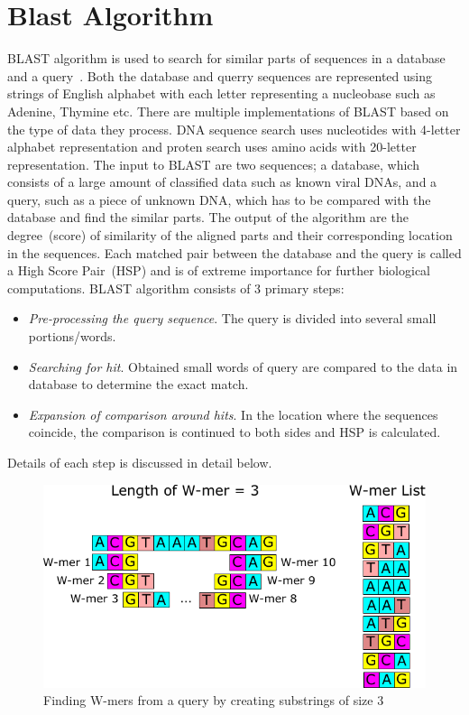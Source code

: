 \section{Blast Algorithm}
\label{sec:blast}

BLAST algorithm is used to search for similar parts of sequences in a database and a query~\cite{Stephen1990}. 
Both the database and querry sequences are represented using strings of English alphabet with each letter representing a nucleobase such as Adenine, Thymine etc.
There are multiple implementations of BLAST based on the type of data they process. 
DNA sequence search uses nucleotides with 4-letter alphabet representation and proten search uses amino acids with 20-letter representation. 
The input to BLAST are two sequences; a database, which consists of a large amount of classified data such as known viral DNAs, and a query, such as a piece of unknown DNA, which has to be compared with the database and find the similar parts. 
The output of the algorithm are the degree~(score) of similarity of the aligned parts and their corresponding location in the sequences. 
Each matched pair between the database and the query is called a High Score Pair~(HSP) and is of extreme importance for further biological computations. 
BLAST algorithm consists of 3 primary steps:
\begin{itemize}
\item{\textit{Pre-processing the query sequence}. The query is divided into several small portions/words.} 
\item{\textit{Searching for hit}. Obtained small words of query are compared to the data in database to determine the exact match.}
\item{\textit{Expansion of comparison around hits}. In the location where the sequences coincide, the comparison is continued to both sides and HSP is calculated.}
\end{itemize}
Details of each step is discussed in detail below.

\begin{figure}[t!]
\centering
\includegraphics[width=\columnwidth]{Figures/Algorithm1.pdf}
\caption{Finding W-mers from a query by creating substrings of size 3} \label{fig:step1}
\end{figure}


